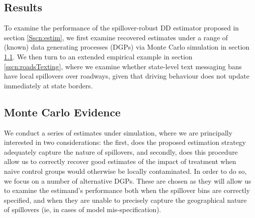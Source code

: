 \documentclass[12pt]{article}
\begin{document}
\begin{spacing}{1.3}


\section{Results}
To examine the performance of the spillover-robust DD estimator proposed
in section \ref{Sscn:estim}, we first examine recovered estimates under
a range of (known) data generating processes (DGPs) via Monte Carlo
simulation in section \ref{sscn:montecarlo}. We then turn to an extended
empirical example in section \ref{sscn:roadsTexting}, where we examine
whether state-level text messaging bans have local spillovers over roadways,
given that driving behaviour does not update immediately at state borders.

\subsection{Monte Carlo Evidence}
\label{sscn:montecarlo}
We conduct a series of estimates under simulation, where we are principally
interested in two considerations: the first, does the proposed estimation
strategy adequately capture the nature of spillovers, and secondly, does
this procedure allow us to correctly recover good estimates of the impact of
treatment when naive control groups would otherwise be locally contaminated.
In order to do so, we focus on a number of alternative DGPs.  These are
chosen as they will allow us to examine the estimand's performance both when
the spillover bins are correctly specified, and when they are unable to
precisely capture the geographical nature of spillovers (ie, in cases of
model mis-specification).


\end{spacing}
\end{document}
